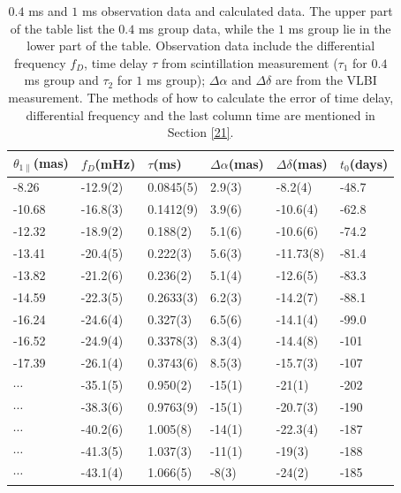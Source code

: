 \documentclass[useAMS,usenatbib]{mn2e}
\begin{document}
\begin{table}
\centering
\begin{tabular}{llllll}
\hline
$\theta_{1\parallel}$(mas) & $f_D$(mHz) & $\tau$(ms)  & $\Delta\alpha$(mas) & $\Delta\delta$(mas) & $t_0$(days)\\
\hline
 -8.26   & -12.9(2)      & 0.0845(5) & 2.9(3)  & -8.2(4)      & -48.7                                \\
-10.68   &-16.8(3)      & 0.1412(9)  & 3.9(6) & -10.6(4)      &-62.8                                \\
-12.32   &-18.9(2)      & 0.188(2)   & 5.1(6) & -10.6(6)      &-74.2                        \\
-13.41 & -20.4(5)      & 0.222(3)     & 5.6(3)  & -11.73(8)    &-81.4                                \\
-13.82 &-21.2(6)        & 0.236(2)    & 5.1(4)  & -12.6(5)      &-83.3                                \\
-14.59   &-22.3(5)      & 0.2633(3)    & 6.2(3)  & -14.2(7)     &-88.1                                \\
-16.24   &-24.6(4)       & 0.327(3)   & 6.5(6)  & -14.1(4)       &-99.0                                \\
-16.52  &-24.9(4)      & 0.3378(3)         & 8.3(4)  & -14.4(8)      &-101                                \\
-17.39   &-26.1(4)    & 0.3743(6)         & 8.5(3)    & -15.7(3)      &-107                               
\\ \hline
$\cdots$&         -35.1(5)  & 0.950(2)   & -15(1)  & -21(1)   &-202                                   \\
$\cdots$ & -38.3(6)  & 0.9763(9)   & -15(1)       & -20.7(3)  &-190                                    \\
$\cdots$ & -40.2(6)  & 1.005(8)    & -14(1)       & -22.3(4)  &-187                                   \\
$\cdots$ & -41.3(5)    & 1.037(3)   & -11(1)     & -19(3)   &-188                                   \\
$ \cdots$ & -43.1(4)      & 1.066(5)    & -8(3)     & -24(2)   &-185   \\
 \hline                                 
\end{tabular}
\caption{ $0.4$ ms and $1$ ms observation data and calculated data. 
The upper part of the table list the $0.4$ ms group data, while the $1$ ms group lie in the lower part of the table. 
Observation data include the differential frequency $f_D$, time delay $\tau$ from scintillation measurement ($\tau_1$ for $0.4$ ms group and $\tau_2$ for $1$ ms group); $\Delta\alpha$ and $\Delta\delta$ are from the VLBI measurement. The methods of how to calculate the error of time delay, differential frequency and the last column time are mentioned in Section \ref{21}.}
\label{table:apex}
\end{table}
\end{document}
